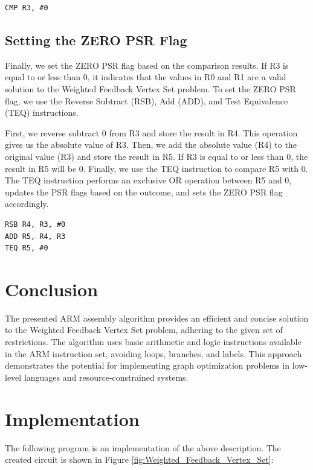 \begin{verbatim}
CMP R3, #0
\end{verbatim}

\subsection{Setting the ZERO PSR Flag}
Finally, we set the ZERO PSR flag based on the comparison results. If R3 is equal to or less than 0, it indicates that the values in R0 and R1 are a valid solution to the Weighted Feedback Vertex Set problem. To set the ZERO PSR flag, we use the Reverse Subtract (RSB), Add (ADD), and Test Equivalence (TEQ) instructions. 

First, we reverse subtract 0 from R3 and store the result in R4. This operation gives us the absolute value of R3. Then, we add the absolute value (R4) to the original value (R3) and store the result in R5. If R3 is equal to or less than 0, the result in R5 will be 0. Finally, we use the TEQ instruction to compare R5 with 0. The TEQ instruction performs an exclusive OR operation between R5 and 0, updates the PSR flags based on the outcome, and sets the ZERO PSR flag accordingly.

\begin{verbatim}
RSB R4, R3, #0
ADD R5, R4, R3
TEQ R5, #0
\end{verbatim}

\section{Conclusion}
The presented ARM assembly algorithm provides an efficient and concise solution to the Weighted Feedback Vertex Set problem, adhering to the given set of restrictions. The algorithm uses basic arithmetic and logic instructions available in the ARM instruction set, avoiding loops, branches, and labels. This approach demonstrates the potential for implementing graph optimization problems in low-level languages and resource-constrained systems.



\section{Implementation}

The following program is an implementation of the above description. The created circuit is shown in Figure \ref{fig:Weighted_Feedback_Vertex_Set}:

